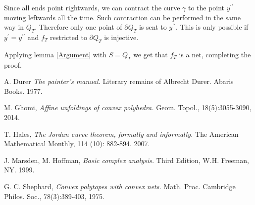 \documentclass[openright, 12pt]{article}
\begin{document}
Since all ends point rightwards, we can contract the curve $\gamma$ to the point  $y^{\prime \prime}$ moving leftwards all the time. Such contraction can be performed in the same way in $Q_T$. Therefore only one point of $\partial Q _T$ is sent to $y^{\prime \prime}$. This is only possible if $y^{\prime} = y^{\prime \prime}$ and $f_T$ restricted to $\partial Q_T$ is injective.


Applying lemma \ref{Argument} with $S=Q_T$ we get that $f_T$ is a net, completing the proof.


\begin{thebibliography}{9}

 A. Durer \textit{The painter's manual.} Literary remains of Albrecht Durer. Abaris Books. 1977.

 M. Ghomi, \textit{Affine unfoldings of convex polyhedra.} Geom. Topol., 18(5):3055-3090, 2014. 
  
  
  T. Hales, \textit{The Jordan curve theorem, formally and informally.} The American Mathematical Monthly, 114 (10): 882-894. 2007.

  J. Marsden, M. Hoffman,  \textit{Basic complex analysis.} Third Edition, W.H. Freeman, NY. 1999.  
  

G. C. Shephard, \textit{Convex polytopes with convex nets.} Math. Proc. Cambridge Philos. Soc., 78(3):389-403, 1975. 
  
\end{thebibliography}
\end{document}
